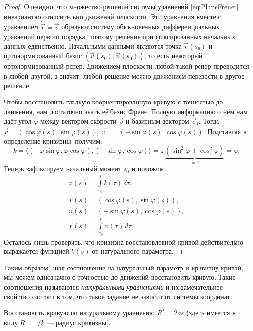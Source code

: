 \begin{proof}
	Очевидно, что множество решений системы уравнений \eqref{eq:PlaneFrenet} инвариантно относительно движений плоскости. Эти уравнения вместе с уравнением $\dot{\vec{r}} = \vec{v}$ образуют систему обыкновенных дифференциальных уравнений первого порядка, поэтому решение при фиксированных начальных данных единственно. Начальными данными являются точка $\vec{r}(s_0)$ и ортонормированный базис $(\vec{v}(s_0), \vec{n}(s_0))$, то есть некоторый ортонормированный репер. Движением плоскости любой такой репер переводится в любой другой, а значит, любой решение можно движением перевести в другое решение.

	Чтобы восстановить гладкую коориентированную кривую с точностью до движения, нам достаточно знать её базис Френе. Полную информацию о нём нам даёт угол $\varphi$ между вектором скорости $\vec{v}$ и базисным вектором $\vec{e}_1$. Тогда $\vec{v} = (\cos\varphi(s), \sin\varphi(s))$, $\vec{v}^\perp = (-\sin\varphi(s), \cos\varphi(s))$. Подставляя в определение кривизны, получим:
	\begin{equation} \label{eq:AngleByCurvature}
		k = \big\langle(-\dot{\varphi}\sin\varphi, \dot{\varphi}\cos\varphi), (-\sin\varphi, \cos\varphi)\big\rangle = \dot{\varphi}\underbrace{(\sin^2\varphi + \cos^2\varphi)}_{= 1} = \dot{\varphi}.
	\end{equation}
	Теперь зафиксируем начальный момент $s_0$ и положим
	\begin{gather*}
		\varphi(s) = \int\limits_{s_0}^sk(\tau)\,d\tau,\\
		\vec{v}(s) = (\cos\varphi(s), \sin\varphi(s)),\\
		\vec{n}(s) = (-\sin\varphi(s), \cos\varphi(s)),\\
		\vec{r}(s) = \int\limits_{s_0}^s\vec{v}(\tau)\,d\tau.
	\end{gather*}
	Осталось лишь проверить, что кривизна восстановленной кривой действительно выражается функцией $k(s)$ от натурального параметра.
\end{proof}

Таким образом, зная соотношение на натуральный параметр и кривизну кривой, мы можем однозначно с точностью до движений восстановить кривую. Такие соотношения называются \textit{натуральными уравнениями} и их замечательное свойство состоит в том, что такое задание не зависит от системы координат.

\begin{problem} \label{problem:NaturalEquation}
	Восстановить кривую по натуральному уравнению $R^2 = 2as$ (здесь имеется в виду $R = 1 / k$ --- радиус кривизны\footnotemark).
\end{problem}

